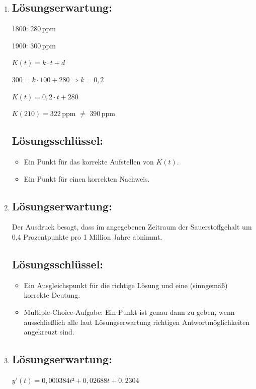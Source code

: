 \begin{langesbeispiel}
{\begin{enumerate}
\begin{itemize}
	\end{itemize}
	
	\item \subsection{Lösungserwartung:}
			
		1800: 280\,ppm
		
		1900: 300\,ppm\leer
		
		$K(t)=k\cdot t+d$
		
		$300=k\cdot 100+280 \Rightarrow k=0,2$\leer
		
		$K(t)=0,2\cdot t+280$\leer
		
		$K(210)=322$\,ppm $\neq$ 390\,ppm
		
	\subsection{Lösungsschlüssel:}
	
\begin{itemize}
	\item  Ein Punkt für das korrekte Aufstellen von $K(t)$.
	\item  Ein Punkt für einen korrekten Nachweis. 
\end{itemize}

\item \subsection{Lösungserwartung:}
			Der Ausdruck besagt, dass im angegebenen Zeitraum der Sauerstoffgehalt um 0,4 Prozentpunkte pro 1 Million Jahre abnimmt.
		
	\subsection{Lösungsschlüssel:}
	
\begin{itemize}
	\item  Ein Ausgleichspunkt für die richtige Lösung und eine (sinngemäß) korrekte Deutung.
	\item  Multiple-Choice-Aufgabe: Ein Punkt ist genau dann zu geben, wenn ausschließlich alle laut Lösungserwartung richtigen Antwortmöglichkeiten angekreuzt sind. 
\end{itemize}

\item \subsection{Lösungserwartung:}
			$y'(t)=0,000384t²+0,02688t+0,2304$
			

\end{enumerate}}
\end{langesbeispiel}
